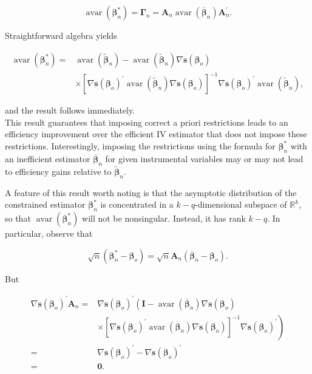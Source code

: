 \documentclass[10pt]{article}
\begin{document}
$$
\operatorname{avar}\left(\boldsymbol{\beta}_{n}^{*}\right)=\boldsymbol{\Gamma}_{n}=\mathbf{A}_{n} \operatorname{avar}\left(\overline{\boldsymbol{\beta}}_{n}\right) \mathbf{A}_{n}^{\prime} .
$$

Straightforward algebra yields

$$
\begin{aligned}
\operatorname{avar}\left(\boldsymbol{\beta}_{n}^{*}\right)= & \operatorname{avar}\left(\tilde{\boldsymbol{\beta}}_{n}\right)-\operatorname{avar}\left(\tilde{\boldsymbol{\beta}}_{n}\right) \nabla \mathbf{s}\left(\boldsymbol{\beta}_{o}\right) \\
& \times\left[\nabla \mathbf{s}\left(\boldsymbol{\beta}_{o}\right)^{\prime} \operatorname{avar}\left(\tilde{\boldsymbol{\beta}}_{n}\right) \nabla \mathbf{s}\left(\boldsymbol{\beta}_{o}\right)\right]^{-1} \nabla \mathbf{s}\left(\boldsymbol{\beta}_{o}\right)^{\prime} \operatorname{avar}\left(\tilde{\boldsymbol{\beta}}_{n}\right),
\end{aligned}
$$

and the result follows immediately.\\
This result guarantees that imposing correct a priori restrictions leads to an efficiency improvement over the efficient IV estimator that does not impose these restrictions. Interestingly, imposing the restrictions using the formula for $\boldsymbol{\beta}_{n}^{*}$ with an inefficient estimator $\overline{\boldsymbol{\beta}}_{n}$ for given instrumental variables may or may not lead to efficiency gains relative to $\tilde{\boldsymbol{\beta}}_{n}$.

A feature of this result worth noting is that the asymptotic distribution of the constrained estimator $\boldsymbol{\beta}_{n}^{*}$ is concentrated in a $k-q$-dimensional subspace of $\mathbb{R}^{k}$, so that $\operatorname{avar}\left(\boldsymbol{\beta}_{n}^{*}\right)$ will not be nonsingular. Instead, it has rank $k-q$. In particular, observe that

$$
\sqrt{n}\left(\boldsymbol{\beta}_{n}^{*}-\boldsymbol{\beta}_{o}\right)=\sqrt{n} \mathbf{A}_{n}\left(\overline{\boldsymbol{\beta}}_{n}-\boldsymbol{\beta}_{o}\right) .
$$

But

$$
\begin{aligned}
\nabla \mathbf{s}\left(\boldsymbol{\beta}_{o}\right)^{\prime} \mathbf{A}_{n}= & \nabla \mathbf{s}\left(\boldsymbol{\beta}_{o}\right)^{\prime}\left(\mathbf{I}-\operatorname{avar}\left(\overline{\boldsymbol{\beta}}_{n}\right) \nabla \mathbf{s}\left(\boldsymbol{\beta}_{o}\right)\right. \\
& \left.\times\left[\nabla \mathbf{s}\left(\boldsymbol{\beta}_{o}\right)^{\prime} \operatorname{avar}\left(\overline{\boldsymbol{\beta}}_{n}\right) \nabla \mathbf{s}\left(\boldsymbol{\beta}_{o}\right)\right]^{-1} \nabla \mathbf{s}\left(\boldsymbol{\beta}_{o}\right)^{\prime}\right) \\
= & \nabla \mathbf{s}\left(\boldsymbol{\beta}_{o}\right)^{\prime}-\nabla \mathbf{s}\left(\boldsymbol{\beta}_{o}\right)^{\prime} \\
= & \mathbf{0} .
\end{aligned}
$$
\end{document}

